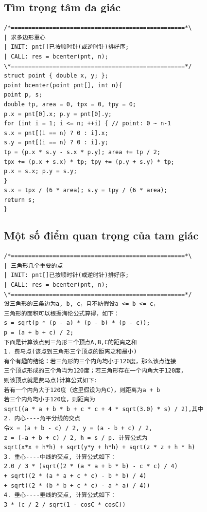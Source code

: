 \documentclass[11pt]{article}
\begin{document}
\subsection{Tìm trọng tâm đa giác}

\begingroup
\scriptsize
\begin{verbatim}
/*==================================================*\
| 求多边形重心
| INIT: pnt[]已按顺时针(或逆时针)排好序;
| CALL: res = bcenter(pnt, n);
\*==================================================*/
struct point { double x, y; };
point bcenter(point pnt[], int n){
point p, s;
double tp, area = 0, tpx = 0, tpy = 0;
p.x = pnt[0].x; p.y = pnt[0].y;
for (int i = 1; i <= n; ++i) { // point: 0 ~ n-1
s.x = pnt[(i == n) ? 0 : i].x;
s.y = pnt[(i == n) ? 0 : i].y;
tp = (p.x * s.y - s.x * p.y); area += tp / 2;
tpx += (p.x + s.x) * tp; tpy += (p.y + s.y) * tp;
p.x = s.x; p.y = s.y;
}
s.x = tpx / (6 * area); s.y = tpy / (6 * area);
return s;
}
\end{verbatim}
\endgroup

\subsection{Một số điểm quan trọng của tam giác}

\begingroup
\scriptsize
\begin{verbatim}
/*==================================================*\
| 三角形几个重要的点
| INIT: pnt[]已按顺时针(或逆时针)排好序;
| CALL: res = bcenter(pnt, n);
\*==================================================*/
设三角形的三条边为a, b, c，且不妨假设a <= b <= c，
三角形的面积可以根据海伦公式算得，如下：
s = sqrt(p * (p - a) * (p - b) * (p - c));
p = (a + b + c) / 2;
下面是计算该点到三角形三个顶点A,B,C的距离之和
1. 费马点(该点到三角形三个顶点的距离之和最小)
有个有趣的结论：若三角形的三个内角均小于120度，那么该点连接
三个顶点形成的三个角均为120度；若三角形存在一个内角大于120度，
则该顶点就是费马点)计算公式如下:
若有一个内角大于120度（这里假设为角C)，则距离为a + b
若三个内角均小于120度，则距离为
sqrt((a * a + b * b + c * c + 4 * sqrt(3.0) * s) / 2),其中
2. 内心----角平分线的交点
令x = (a + b - c) / 2, y = (a - b + c) / 2,
z = (-a + b + c) / 2, h = s / p. 计算公式为
sqrt(x*x + h*h) + sqrt(y*y + h*h) + sqrt(z * z + h * h)
3. 重心----中线的交点, 计算公式如下：
2.0 / 3 * (sqrt((2 * (a * a + b * b) - c * c) / 4)
+ sqrt((2 * (a * a + c * c) - b * b) / 4)
+ sqrt((2 * (b * b + c * c) - a * a) / 4))
4. 垂心----垂线的交点, 计算公式如下：
3 * (c / 2 / sqrt(1 - cosC * cosC))
\end{verbatim}
\endgroup
\end{document}
